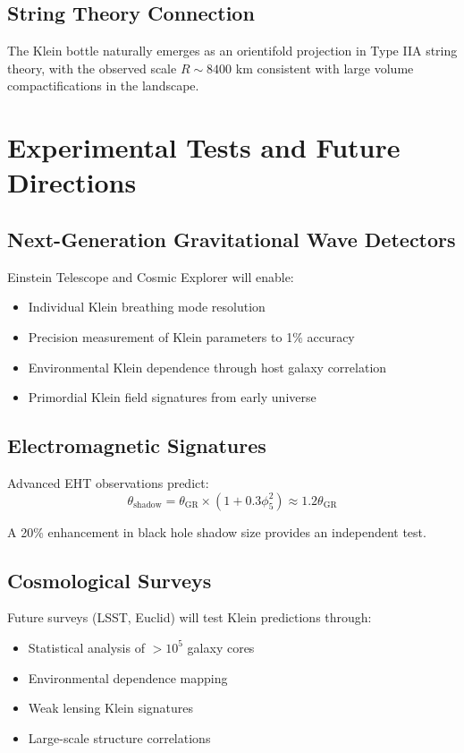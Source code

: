 \documentclass[12pt]{iopart}
\begin{document}
\subsection{String Theory Connection}

The Klein bottle naturally emerges as an orientifold projection in Type IIA string theory, with the observed scale $R \sim 8400$ km consistent with large volume compactifications in the landscape.

\section{Experimental Tests and Future Directions}

\subsection{Next-Generation Gravitational Wave Detectors}

Einstein Telescope and Cosmic Explorer will enable:
\begin{itemize}
\item Individual Klein breathing mode resolution
\item Precision measurement of Klein parameters to 1\% accuracy
\item Environmental Klein dependence through host galaxy correlation
\item Primordial Klein field signatures from early universe
\end{itemize}

\subsection{Electromagnetic Signatures}

Advanced EHT observations predict:
\begin{equation}
\theta_{\text{shadow}} = \theta_{\text{GR}} \times (1 + 0.3\phi_5^2) \approx 1.2\theta_{\text{GR}}
\label{eq:shadow_enhancement}
\end{equation}

A 20\% enhancement in black hole shadow size provides an independent test.

\subsection{Cosmological Surveys}

Future surveys (LSST, Euclid) will test Klein predictions through:
\begin{itemize}
\item Statistical analysis of $>10^5$ galaxy cores
\item Environmental dependence mapping
\item Weak lensing Klein signatures
\item Large-scale structure correlations
\end{itemize}
\end{document}
